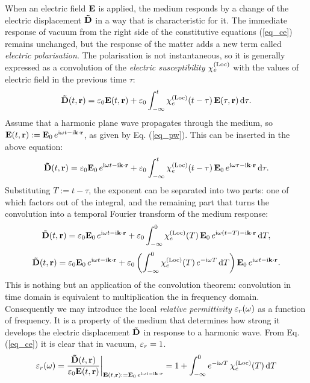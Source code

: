 When an electric field $\mathbf{E}$ is applied, the medium responds by a change of the electric displacement $\mathbf{\tilde{D}}$ in a way that is characteristic for it. 
The immediate response of vacuum from the right side of the constitutive equations (\ref{eq_ce}) remains unchanged, but the response of the matter adds a new term called \textit{electric polarisation}. The polarisation is not instantaneous, so it is generally expressed as a convolution of the \textit{electric susceptibility} $\chi_e^{\rm(Loc)}$ with the values of electric field in the previous time $\tau$:
\begin{equation} \mathbf{\tilde{D}}(t,{\mathbf{r}}) = \varepsilon_0 \mathbf{E}(t,{\mathbf{r}}) + \varepsilon_0 \int_{-\infty}^{t}\chi_e^{\rm(Loc)}(t-\tau)\, \mathbf{E}(\tau,{\mathbf{r}})\,\mbox{d}\tau. \label{eq_loc_chi_convol}\end{equation}
Assume that a harmonic plane wave propagates through the medium, so $\mathbf{E}(t, {\mathbf{r}}) := \mathbf{E}_0 \, e^{{\mathrm i}\omega t - {\mathrm i}{\mathbf{k}}\cdot{\mathbf{r}}}$, as given by Eq. (\ref{eq_pw}). This can be inserted in the above equation:
\begin{equation} \mathbf{\tilde{D}}(t,{\mathbf{r}}) = \varepsilon_0 \mathbf{E}_0 \, e^{{\mathrm i}\omega t - {\mathrm i}{\mathbf{k}}\cdot{\mathbf{r}}} + \varepsilon_0 \int_{-\infty}^{t} \chi_e^{\rm(Loc)}(t-\tau) \, \mathbf{E}_0 \, e^{{\mathrm i}\omega \tau - {\mathrm i}{\mathbf{k}}\cdot{\mathbf{r}}} \,\mbox{d}\tau. \label{eq_chi_convol_harm}\end{equation}
Substituting $T:=t-\tau$, the exponent can be separated into two parts: one of which factors out of the integral, and the remaining part that turns the convolution into a temporal Fourier transform of the medium response:
$$				 \mathbf{\tilde{D}}(t,{\mathbf{r}}) = \varepsilon_0 \mathbf{E}_0 \, e^{{\mathrm i}\omega t - {\mathrm i}{\mathbf{k}}\cdot{\mathbf{r}}} + \varepsilon_0 \int_{-\infty}^{0} \chi_e^{\rm(Loc)}(T) \, \mathbf{E}_0 \, e^{{\mathrm i}\omega (t - T) - {\mathrm i}{\mathbf{k}}\cdot{\mathbf{r}}} \,\mbox{d}T,$$
$$				 \mathbf{\tilde{D}}(t,{\mathbf{r}}) = \varepsilon_0 \mathbf{E}_0 \, e^{{\mathrm i}\omega t - {\mathrm i}{\mathbf{k}}\cdot{\mathbf{r}}} + \varepsilon_0 \left( \int_{-\infty}^{0} \chi_e^{\rm(Loc)}(T)  \, e^{-{\mathrm i}\omega T}\,\mbox{d}T  \right) \mathbf{E}_0 \, e^{{\mathrm i}\omega t - {\mathrm i}{\mathbf{k}}\cdot{\mathbf{r}}}.$$
This is nothing but an application of the convolution theorem: convolution in time domain is equivalent to multiplication the in frequency domain.  %
Consequently we may introduce the local \textit{relative permittivity} $\varepsilon_r(\omega)$ as a function of frequency. It is a property of the medium that determines how strong it develops the electric displacement $\mathbf{\tilde{D}}$ in response to a harmonic wave. From Eq. (\ref{eq_ce}) it is clear that in vacuum,  $\varepsilon_r = 1$.
\begin{equation}  \varepsilon_r(\omega) =   \frac{\mathbf{\tilde{D}}(t,{\mathbf{r}})}{\varepsilon_0 \mathbf{E}(t,{\mathbf{r}})} \biggr|_{\mathbf{E}(t, {\mathbf{r}}) := \mathbf{E}_0 \, e^{{\mathrm i}\omega t - {\mathrm i}{\mathbf{k}}\cdot{\mathbf{r}}}} = 1 + \int_{-\infty}^{0} e^{-{\mathrm i}\omega T} \,\chi_e^{\rm(Loc)}(T) \,\mbox{d}T \label{eq_eps_loc}\end{equation}
